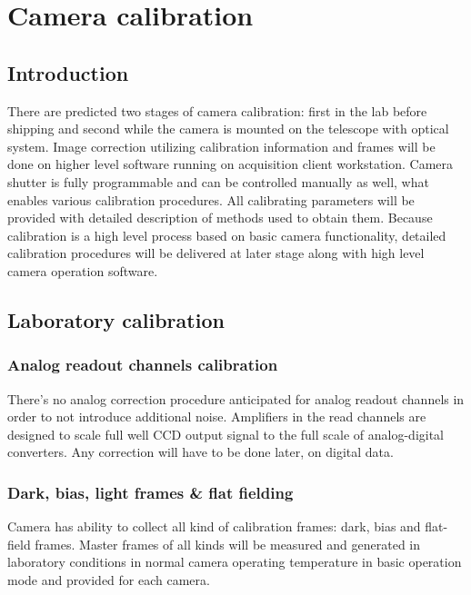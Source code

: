 \section{Camera calibration}

\subsection{Introduction}
There are predicted two stages of camera calibration: first in the lab before shipping and second while the camera is mounted on the telescope with optical system. Image correction utilizing calibration information and frames will be done on higher level software running on acquisition client workstation. Camera shutter is fully programmable and can be controlled manually as well, what enables various calibration procedures. All calibrating parameters will be provided with detailed description of methods used to obtain them. Because calibration is a high level process based on basic camera functionality, detailed calibration procedures will be delivered at later stage along with high level camera operation software.

\subsection{Laboratory calibration}

\subsubsection{Analog readout channels calibration}
There's no analog correction procedure anticipated for analog readout channels in order to not introduce additional noise. Amplifiers in the read channels are designed to scale full well CCD output signal to the full scale of analog-digital converters. Any correction will have to be done later, on digital data.

\subsubsection{Dark, bias, light frames \& flat fielding}
Camera has ability to collect all kind of calibration frames: dark, bias and flat-field frames. Master frames of all kinds will be measured and generated in laboratory conditions in normal camera operating temperature in basic operation mode and provided for each camera. 

